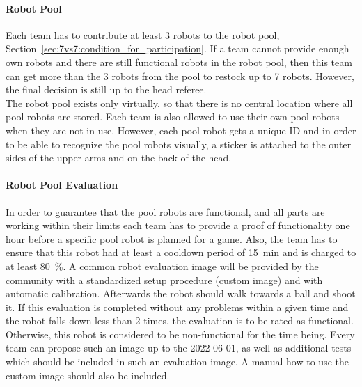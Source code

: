         \paragraph{Robot Pool}
            Each team has to contribute at least 3 robots to the robot pool, \cf Section~\ref{sec:7vs7:condition_for_participation}. If a team cannot provide enough own robots and there are still functional robots in the robot pool, then this team can get more than the 3 robots from the pool to restock up to 7 robots. However, the final decision is still up to the head referee. \\
            The robot pool exists only virtually, so that there is no central location where all pool robots are stored. Each team is also allowed to use their own pool robots when they are not in use. However, each pool robot gets a unique ID and in order to be able to recognize the pool robots visually, a sticker is attached to the outer sides of the upper arms and on the back of the head.

        \paragraph{Robot Pool Evaluation}
            In order to guarantee that the pool robots are functional, and all parts are working within their limits each team has to provide a proof of functionality one hour before a specific pool robot is planned for a game. Also, the team has to ensure that this robot had at least a cooldown period of \qty{15}{\minute} and is charged to at least \qty{80}{\percent}.
            A common robot evaluation image will be provided by the community with a standardized setup procedure (custom image) and with automatic calibration. Afterwards the robot should walk towards a ball and shoot it. If this evaluation is completed without any problems within a given time  and the robot falls down less than 2 times, the evaluation is to be rated as functional. Otherwise, this robot is considered to be non-functional for the time being. Every team can propose such an image up to the 2022-06-01, as well as additional tests which should be included in such an evaluation image. A manual how to use the custom image should also be included.

